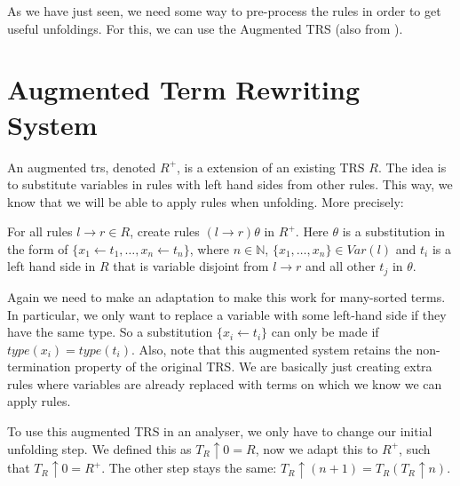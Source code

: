 As we have just seen, we need some way to pre-process the rules in order to get useful unfoldings. For this, we can use the Augmented TRS (also from \cite{Payet:Unfolding}).  

\section{Augmented Term Rewriting System}
An augmented trs, denoted $R^+$, is a extension of an existing TRS $R$. The idea is to substitute variables in rules with left hand sides from other rules. This way, we know that we will be able to apply rules when unfolding. More precisely:
\begin{definition}
\label{def:augmentedtrs}
For all rules $l \rightarrow r \in R$, create rules $(l \rightarrow r)\theta$ in $R^+$. Here $\theta$ is a substitution in the form of $\{ x_1 \leftarrow t_1, \dots, x_n \leftarrow t_n \}$, where $n \in \mathbb{N}$, $\{ x_1, \dots, x_n \} \in \textit{Var}(l)$ and $t_i$ is a left hand side in $R$ that is variable disjoint from $l \rightarrow r$ and all other $t_j$ in $\theta$. 
\end{definition}

Again we need to make an adaptation to make this work for many-sorted terms. In particular, we only want to replace a variable with some left-hand side if they have the same type. So a substitution $\{ x_i \leftarrow t_i \}$ can only be made if $\textit{type}(x_i) = \textit{type}(t_i)$. Also, note that this augmented system retains the non-termination property of the original TRS. We are basically just creating extra rules where variables are already replaced with terms on which we know we can apply rules.  

To use this augmented TRS in an analyser, we only have to change our initial unfolding step. We defined this as $T_R \uparrow 0 = R$, now we adapt this to $R^+$, such that $T_R \uparrow 0 = R^+$. The other step stays the same: $T_R \uparrow (n + 1) = T_R(T_R \uparrow n)$. 

